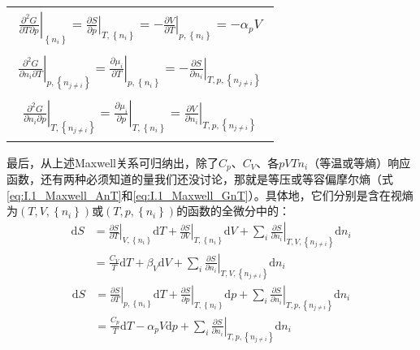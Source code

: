 \documentclass[main.tex]{subfiles}
\begin{document}
\begin{longtable}{m{}}
    \begin{align}
        \left.\frac{\partial^2 G}{\partial T\partial p}\right|_{\left\{n_i\right\}}              =\left.\frac{\partial S}{\partial p}\right|_{T,\left\{n_i\right\}}=-\left.\frac{\partial V}{\partial T}\right|_{p,\left\{n_i\right\}}=-\alpha_p V\label{eq:I.1_Maxwell_GTp}\end{align}                  \\[-8ex]
    \begin{align}\left.\frac{\partial ^2G}{\partial n_i\partial T}\right|_{p,\left\{n_{j\neq i}\right\}}  =\left.\frac{\partial \mu_i}{\partial T}\right|_{p,\left\{n_i\right\}}=-\left.\frac{\partial S}{\partial n_i}\right|_{T,p,\left\{n_{j\neq i}\right\}}\label{eq:I.1_Maxwell_GnT}\end{align} \\[-8ex]
    \begin{align}\left.\frac{\partial ^2G}{\partial n_i\partial p}\right|_{T,\left\{n_{j\neq i}\right\}}  =\left.\frac{\partial \mu_i}{\partial p}\right|_{T,\left\{n_i\right\}}=\left.\frac{\partial V}{\partial n_i}\right|_{T,p,\left\{n_{j\neq i}\right\}}\label{eq:I.1_Maxwell_GnV}\end{align}  \\
    \hline
\end{longtable}
最后，从上述Maxwell关系可归纳出，除了$C_p$、$C_V$、各$pVTn_i$（等温或等熵）响应函数，还有两种必须知道的量我们还没讨论，那就是等压或等容偏摩尔熵（式\eqref{eq:I.1_Maxwell_AnT}和\eqref{eq:I.1_Maxwell_GnT}）。具体地，它们分别是含在视熵为$\left(T,V,\left\{n_i\right\}\right)$或$\left(T,p,\left\{n_i\right\}\right)$的函数的全微分中的：
\begin{equation}
    \begin{aligned}
        \mathrm{d}S & =\left.\frac{\partial S}{\partial T}\right|_{V,\left\{n_i\right\}}\mathrm{d}T+\left.\frac{\partial S}{\partial V}\right|_{T,\left\{n_i\right\}}\mathrm{d}V+\sum_i\left.\frac{\partial S}{\partial n_i}\right|_{T,V,\left\{n_{j\neq i}\right\}}\mathrm{d}n_i \\
                    & =\frac{C_V}{T}\mathrm{d}T+\beta_V\mathrm{d}V+\sum_i\left.\frac{\partial S}{\partial n_i}\right|_{T,V,\left\{n_{j\neq i}\right\}}\mathrm{d}n_i \label{eq:I.1_dS_T_V}
    \end{aligned}
\end{equation}
\begin{equation}
    \begin{aligned}
        \mathrm{d}S & =\left.\frac{\partial S}{\partial T}\right|_{p,\left\{n_i\right\}}\mathrm{d}T+\left.\frac{\partial S}{\partial p}\right|_{T,\left\{n_i\right\}}\mathrm{d}p+\sum_i\left.\frac{\partial S}{\partial n_i}\right|_{T,p,\left\{n_{j\neq i}\right\}}\mathrm{d}n_i \\
                    & =\frac{C_p}{T}\mathrm{d}T-\alpha_pV\mathrm{d}p+\sum_i\left.\frac{\partial S}{\partial n_i}\right|_{T,p,\left\{n_{j\neq i}\right\}}\mathrm{d}n_i\label{eq:I.1_dS_T_p}
    \end{aligned}
\end{equation}
\end{document}

